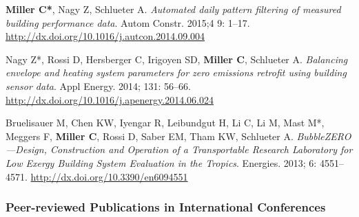 \documentclass[10pt,a4paper]{article}
\begin{document}
\begin{small}
\begin{etaremune}
\item
\textbf{Miller C*}, Nagy Z, Schlueter A. \emph{Automated daily pattern filtering of measured building performance data}. Autom Constr. 2015;4 9: 1–17. \url{http://dx.doi.org/10.1016/j.autcon.2014.09.004}
\item
Nagy Z*, Rossi D, Hersberger C, Irigoyen SD, \textbf{Miller C}, Schlueter A. \emph{Balancing envelope and heating system parameters for zero emissions retrofit using building sensor data}. Appl Energy. 2014; 131: 56–66. \url{http://dx.doi.org/10.1016/j.apenergy.2014.06.024}
\item
Bruelisauer M, Chen KW, Iyengar R, Leibundgut H, Li C, Li M, Mast M*, Meggers F, \textbf{Miller C}, Rossi D, Saber EM, Tham KW, Schlueter A. \emph{BubbleZERO—Design, Construction and Operation of a Transportable Research Laboratory for Low Exergy Building System Evaluation in the Tropics}. Energies. 2013; 6: 4551–4571. \url{http://dx.doi.org/10.3390/en6094551}
\end{etaremune}


\subsubsection*{Peer-reviewed Publications in International Conferences}
\begin{etaremune}


\end{etaremune}
\end{small}
\end{document}
